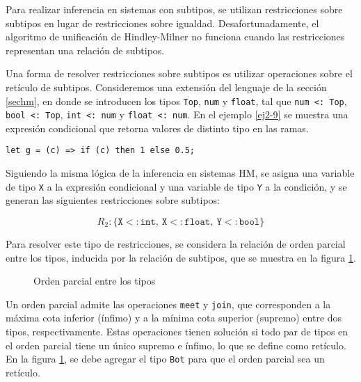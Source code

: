 Para realizar inferencia en sistemas con subtipos, se utilizan restricciones sobre subtipos en lugar de restricciones sobre igualdad. Desafortunadamente, el algoritmo de unificación de Hindley-Milner no funciona cuando las restricciones representan una relación de subtipos.

Una forma de resolver restricciones sobre subtipos es utilizar operaciones sobre el retículo de subtipos. Consideremos una extensión del lenguaje de la sección \ref{sechm}, en donde se introducen los tipos \texttt{Top}, \texttt{num} y \texttt{float}, tal que \texttt{num <: Top}, \texttt{bool <: Top}, \texttt{int <: num} y \texttt{float <: num}. En el ejemplo \ref{ej2-9} se muestra una expresión condicional que retorna valores de distinto tipo en las ramas.
\vspace{0.8em}
\begin{ej}
  \normalfont
  \label{ej2-9}
\begin{lstlisting}[morekeywords={then}]
  let g = (c) => if (c) then 1 else 0.5;
\end{lstlisting}
\end{ej}

Siguiendo la misma lógica de la inferencia en sistemas HM, se asigna una variable de tipo \texttt{X} a la expresión condicional y una variable de tipo \texttt{Y} a la condición, y se generan las siguientes restricciones sobre subtipos:

\[
R_2: \{ \mathtt{X <: int,\ X <: float,\ Y <: bool} \}
\]


Para resolver este tipo de restricciones, se considera la relación de orden parcial entre los tipos, inducida por la relación de subtipos, que se muestra en la figura \ref{subt1}.

\begin{figure}[ht]
  \centering
  \caption{Orden parcial entre los tipos}
  \label{subt1}
\end{figure}

Un orden parcial admite las operaciones \texttt{meet} y \texttt{join}, que corresponden a la máxima cota inferior (ínfimo) y a la mínima cota superior (supremo) entre dos tipos, respectivamente. Estas operaciones tienen solución si todo par de tipos en el orden parcial tiene un único supremo e ínfimo, lo que se define como retículo. En la figura \ref{subt1}, se debe agregar el tipo \texttt{Bot} para que el orden parcial sea un retículo.

